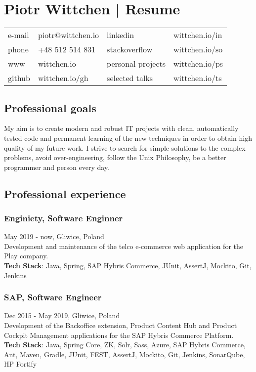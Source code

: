 \documentclass{article}
\begin{document}
  \section*{Piotr Wittchen | Resume}

  \begin{tabular}{llll}\small
    e-mail & piotr@wittchen.io & linkedin          & wittchen.io/in \\
    phone  & +48 512 514 831   & stackoverflow     & wittchen.io/so \\
    www    & wittchen.io       & personal projects & wittchen.io/ps \\
    github & wittchen.io/gh    & selected talks    & wittchen.io/ts \\
  \end{tabular}

    \subsection*{Professional goals}
    \small{My aim is to create modern and robust IT projects with clean,
    automatically tested code and permanent learning of the new techniques
    in order to obtain high quality of my future work.
    I strive to search for simple solutions to the complex problems,
    avoid over-engineering, follow the Unix Philosophy,
    be a better programmer and person every day.}

    \subsection*{Professional experience}

      \subsubsection*{Enginiety, Software Enginner}
      May 2019 - now, Gliwice, Poland\\[0.3em] 
      Development and maintenance of the telco e-commerce web application for the Play company.\\
      \textbf{Tech Stack}: Java, Spring, SAP Hybris Commerce, JUnit, AssertJ, Mockito, Git, Jenkins

      \subsubsection*{SAP, Software Engineer} 
      Dec 2015 - May 2019, Gliwice, Poland\\[0.3em]
      Development of the Backoffice extension, Product Content Hub 
      and Product Cockpit Management applications for the SAP Hybris Commerce Platform.\\
      \textbf{Tech Stack}: Java, Spring Core, ZK, Solr, Sass, Azure, 
      SAP Hybris Commerce, Ant, Maven, Gradle, JUnit, FEST, AssertJ, 
      Mockito, Git, Jenkins, SonarQube, HP Fortify
\end{document}
